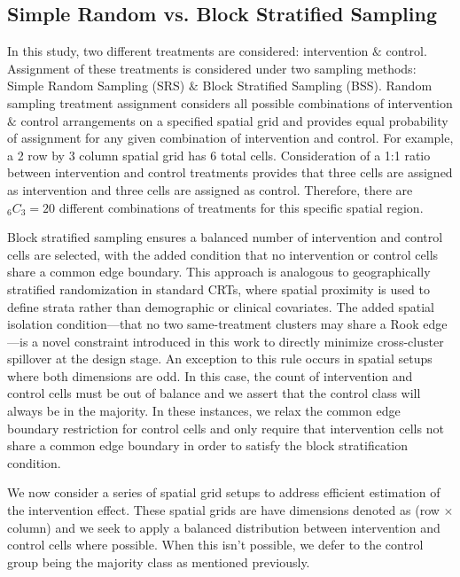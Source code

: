 \documentclass{article}[11pt]
\begin{document}
\subsection{Simple Random vs. Block Stratified Sampling}

In this study, two different treatments are considered: intervention $\&$ control. Assignment of these treatments is considered under two sampling methods: Simple Random Sampling (SRS) $\&$ Block Stratified Sampling (BSS). Random sampling treatment assignment considers all possible combinations of intervention $\&$ control arrangements on a specified spatial grid and provides equal probability of assignment for any given combination of intervention and control. For example, a 2 row by 3 column spatial grid has 6 total cells. Consideration of a 1:1 ratio between intervention and control treatments provides that three cells are assigned as intervention and three cells are assigned as control. Therefore, there are %
$_{6}C_{3}=20$ different combinations of treatments for this specific spatial region. 

Block stratified sampling ensures a balanced number of intervention and control cells are selected, with the added condition that no intervention or control cells share a common edge boundary. This approach is analogous to geographically stratified randomization in standard CRTs, where spatial proximity is used to define strata rather than demographic or clinical covariates\cite{mccann_spatial_2018}\cite{crisp_covariate-constrained_2023}\cite{hayes_cluster_2017}. The added spatial isolation condition---that no two same-treatment clusters may share a Rook edge---is a novel constraint introduced in this work to directly minimize cross-cluster spillover at the design stage. An exception to this rule occurs in spatial setups where both dimensions are odd. In this case, the count of intervention and control cells must be out of balance and we assert that the control class will always be in the majority. In these instances, we relax the common edge boundary restriction for control cells and only require that intervention cells not share a common edge boundary in order to satisfy the block stratification condition.

We now consider a series of spatial grid setups to address efficient estimation of the intervention effect. These spatial grids are have dimensions denoted as (row $\times$ column) and we seek to apply a balanced distribution between intervention and control cells where possible. When this isn't possible, we defer to the control group being the majority class as mentioned previously.
\end{document}
